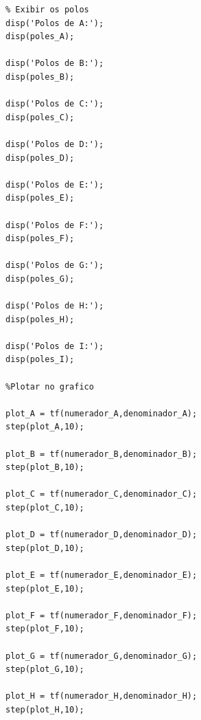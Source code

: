 \documentclass[a4paper,12pt]{article}
\begin{document}
\begin{enumerate}
\begin{lstlisting}
% Exibir os polos
disp('Polos de A:');
disp(poles_A);

disp('Polos de B:');
disp(poles_B);

disp('Polos de C:');
disp(poles_C);

disp('Polos de D:');
disp(poles_D);

disp('Polos de E:');
disp(poles_E);

disp('Polos de F:');
disp(poles_F);

disp('Polos de G:');
disp(poles_G);

disp('Polos de H:');
disp(poles_H);

disp('Polos de I:');
disp(poles_I);

%Plotar no grafico

plot_A = tf(numerador_A,denominador_A);
step(plot_A,10);

plot_B = tf(numerador_B,denominador_B);
step(plot_B,10);

plot_C = tf(numerador_C,denominador_C);
step(plot_C,10);

plot_D = tf(numerador_D,denominador_D);
step(plot_D,10);

plot_E = tf(numerador_E,denominador_E);
step(plot_E,10);

plot_F = tf(numerador_F,denominador_F);
step(plot_F,10);

plot_G = tf(numerador_G,denominador_G);
step(plot_G,10);

plot_H = tf(numerador_H,denominador_H);
step(plot_H,10);


\end{lstlisting}
\end{enumerate}
\end{document}
